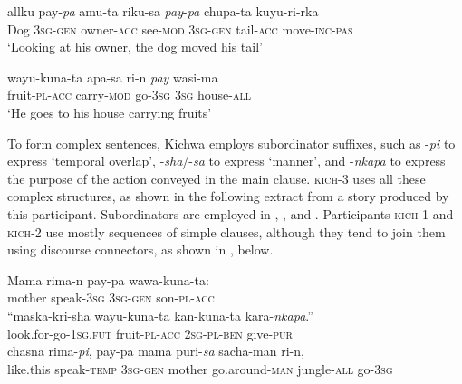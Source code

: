 \documentclass[output=paper]{langscibook}
\begin{document}
\begin{exe}
\ex\label{ex:7:8}
\gll    allku    pay-\textit{pa} amu-ta            riku-sa \textit{pay}{{}-}\textit{pa} chupa-ta    kuyu-ri-rka\\
          Dog  3\textsc{sg-gen}      owner-\textsc{acc}     see-\textsc{mod}  3\textsc{sg-gen}     tail-\textsc{acc}   move-\textsc{inc-pas}\\
\glt  ‘Looking at his owner, the dog moved his tail’
\end{exe}

\begin{exe}
\ex\label{ex:7:9}
\gll wayu-kuna-ta      apa-sa           ri-n \textit{pay} wasi-ma\\
           fruit-\textsc{pl-acc}       carry-\textsc{mod}    go-3\textsc{sg}   \textsc{3sg}   house-\textsc{all}\\
  \glt ‘He goes to his house carrying fruits’
\end{exe}

To form complex sentences, Kichwa employs subordinator suffixes, such as -\textit{pi} to express ‘temporal overlap’, -\textit{sha}/-\textit{sa} to express ‘manner’, and \nobreakdash-\textit{nkapa} to express the purpose of the action conveyed in the main clause. \textsc{kich}{}-3 uses all these complex structures, as shown in the following extract from a story produced by this participant. Subordinators are employed in , , and . Participants \textsc{kich}{}-1 and \textsc{kich}{}-2 use mostly sequences of simple clauses, although they tend to join them using discourse connectors, as shown in , below.


\ea\label{ex:7:10}
\ea\label{ex:7:10a}
\gll  Mama     rima-n          pay-pa          wawa-kuna-ta:\\
  mother    speak-\textsc{3sg}  \textsc{3sg}{}-\textsc{gen}  son-\textsc{pl}{}-\textsc{acc}\\

\ex\label{ex:7:10b}
\gll   ``maska-kri-sha  wayu-kuna-ta    kan-kuna-ta  kara-\textit{nkapa}.''\\
  look.for-go\textsc{{}-}1\textsc{sg.fut}  fruit-\textsc{pl-acc}    2\textsc{sg-pl-ben}  give\textsc{{}-}\textsc{pur}\\

\ex\label{ex:7:10c}
\gll   chasna   rima-\textit{pi},  pay-pa    mama puri-\textit{sa} sacha-man  ri-n,\\
           like.this  speak-\textsc{temp}  \textsc{3sg-gen}  mother  go.around-\textsc{man} jungle-\textsc{all}  go-\textsc{3sg}\\
\end{document}
